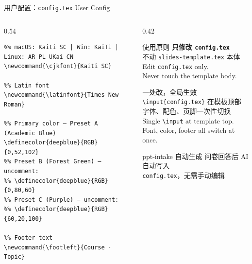 \documentclass[aspectratio=169,10pt]{beamer}
\newcommand{\sectag}[1]{\textmd{\small\normalfont\textcolor{deepblue!60}{#1}}}
\begin{document}
\begin{frame}[fragile]{用户配置：\texttt{config.tex} \sectag{User Config}}
  \begin{columns}[T]
    \begin{column}{0.54\textwidth}
      \begin{Verbatim}[fontsize=\tiny,frame=single,
                       rulecolor=\color{deepblue},
                       label={\footnotesize config.tex}]
%% CJK font
%% macOS: Kaiti SC | Win: KaiTi | Linux: AR PL UKai CN
\newcommand{\cjkfont}{Kaiti SC}

%% Latin font
\newcommand{\latinfont}{Times New Roman}

%% Primary color — Preset A (Academic Blue)
\definecolor{deepblue}{RGB}{0,52,102}
%% Preset B (Forest Green) — uncomment:
%% \definecolor{deepblue}{RGB}{0,80,60}
%% Preset C (Purple) — uncomment:
%% \definecolor{deepblue}{RGB}{60,20,100}

%% Footer text
\newcommand{\footleft}{Course · Topic}
      \end{Verbatim}
    \end{column}
    \begin{column}{0.42\textwidth}
      \begin{exampleblock}{\small 使用原则}
        \footnotesize
        \textbf{只修改 \texttt{config.tex}}\\
        不动 \texttt{slides-template.tex} 本体\\[4pt]
        Edit \texttt{config.tex} only.\\
        Never touch the template body.
      \end{exampleblock}
      \vspace{4pt}
      \begin{block}{\small 一处改，全局生效}
        \footnotesize
        \texttt{\textbackslash input\{config.tex\}} 在模板顶部\\
        字体、配色、页脚一次性切换\\[2pt]
        Single \texttt{\textbackslash input} at template top.\\
        Font, color, footer all switch at once.
      \end{block}
      \vspace{4pt}
      \begin{alertblock}{\small ppt-intake 自动生成}
        \footnotesize
        问卷回答后 AI 自动写入\\
        \texttt{config.tex}，无需手动编辑
      \end{alertblock}
    \end{column}
  \end{columns}
\end{frame}
\end{document}
